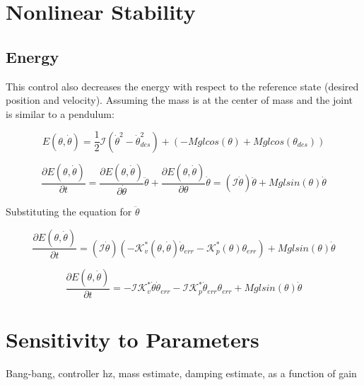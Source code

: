 \documentclass[12pt, letterpaper, oneside, notitlepage, onecolumn]{article}
\newcommand{\bbs}[1]{\section{#1}}
\newcommand{\bbss}[1]{\subsection{#1}}
\begin{document}
\bbs{Nonlinear Stability}

\bbss{Energy}

This control also decreases the energy with respect to the reference state
(desired position and velocity). Assuming the mass is at the center of mass and
the joint is similar to a pendulum:

\begin{equation}
E(\theta, \dot{\theta})
= 
\dfrac{1}{2}\mathcal{I}(\dot{\theta}^{2} - \dot{\theta}_{des}^{2})
+ ( -Mglcos(\theta) + Mglcos(\theta_{des}))
\end{equation}

\begin{equation}
\dfrac{\partial E(\theta, \dot{\theta})}{\partial t} = 
\dfrac{\partial E(\theta, \dot{\theta})}{\partial \dot{\theta}} \ddot{\theta}
+ \dfrac{\partial E(\theta, \dot{\theta})}{\partial \theta} \dot{\theta}
=
(\mathcal{I}\dot{\theta}) \ddot{\theta}
+ Mglsin(\theta) \dot{\theta}
\end{equation}

Substituting the equation for $\ddot{\theta}$

\begin{equation}
\dfrac{\partial E(\theta, \dot{\theta})}{\partial t} = 
(\mathcal{I}\dot{\theta}) 
(-\mathcal{K}_{v}^{*}(\theta, \dot{\theta})
\dot{\theta}_{err}
-\mathcal{K}_{p}^{*}(\theta)
\theta_{err})
+ Mglsin(\theta) \dot{\theta}
\end{equation}

\begin{equation}
\dfrac{\partial E(\theta, \dot{\theta})}{\partial t} = 
-\mathcal{I} \mathcal{K}_{v}^{*} \dot{\theta} 
\dot{\theta}_{err}
-\mathcal{I}
\mathcal{K}_{p}^{*}
\dot{\theta}_{err}
\theta_{err}
+ Mglsin(\theta) \dot{\theta}
\end{equation}


\bbs{Sensitivity to Parameters}

Bang-bang, controller hz, mass estimate, damping estimate, as a function of gain
\end{document}
